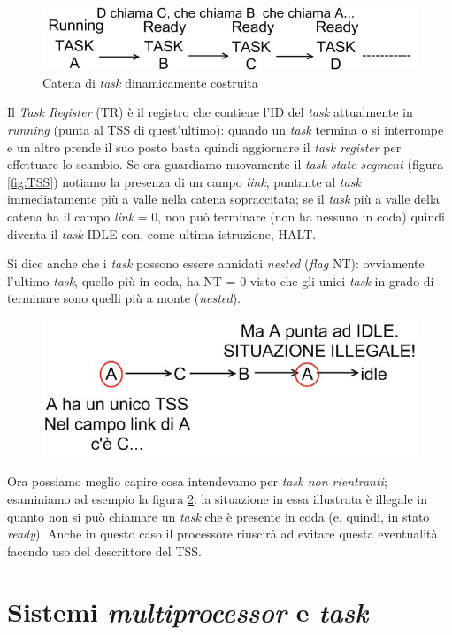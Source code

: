 \begin{figure}[!h]
\centering
\includegraphics[width=0.65\columnwidth]{img/catenaTask}
\caption{Catena di \textit{task} dinamicamente costruita}
\label{fig:catenaTask}
\end{figure}

Il \textit{Task Register} (TR) è il registro che contiene l'ID del \textit{task} attualmente in \textit{running} (punta al TSS di quest'ultimo): quando un \textit{task} termina o si interrompe e un altro prende il suo posto basta quindi aggiornare il \textit{task register} per effettuare lo scambio. Se ora guardiamo nuovamente il  \textit{task state segment} (figura \ref{fig:TSS}) notiamo la presenza di un campo \textit{link}, puntante al \textit{task} immediatamente più a valle nella catena sopraccitata; se il \textit{task} più a valle della catena ha il campo \textit{link} = 0, non può terminare (non ha nessuno in coda) quindi diventa il \textit{task} IDLE con, come ultima istruzione, HALT.

Si dice anche che i \textit{task} possono essere annidati \textit{nested} (\textit{flag} NT): ovviamente l'ultimo \textit{task}, quello più in coda, ha NT = 0 visto che gli unici \textit{task} in grado di terminare sono quelli più a monte (\textit{nested}).

\begin{figure}[!h]
\centering
\includegraphics[width=0.59\columnwidth]{img/taskNonRientranti}
\caption{}
\label{fig:taskNonRientranti}
\end{figure}

Ora possiamo meglio capire cosa intendevamo per \textit{task non rientranti}; esaminiamo ad esempio la figura \ref{fig:taskNonRientranti}: la situazione in essa illustrata è illegale in quanto non si può chiamare un \textit{task} che è presente in coda (e, quindi, in stato \textit{ready}). Anche in questo caso il processore riuscirà ad evitare questa eventualità facendo uso del descrittore del TSS.

\section{Sistemi \textit{multiprocessor} e \textit{task}}
\label{sec:multiprocessorTask}

